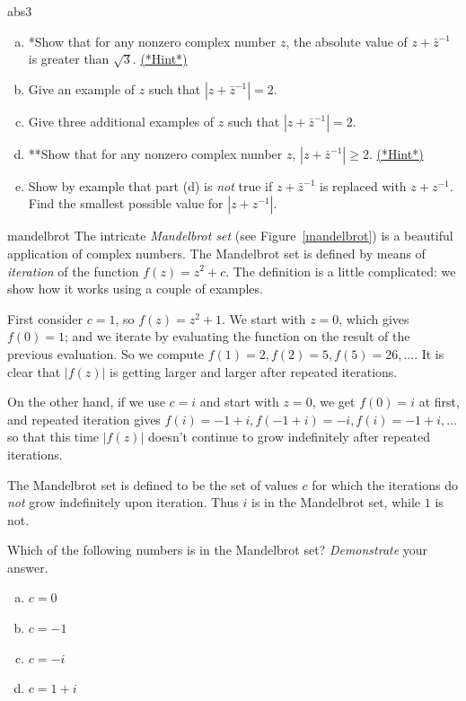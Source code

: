\begin{exercise}{abs3}
\begin{enumerate}[(a)]
\item *Show that for any nonzero complex number $z$, the absolute value of $z + \bar{z}^{-1}$ is greater than $\sqrt{3}$. 
\hyperref[sec:complex:hints]{(*Hint*)}

\item Give an example of $z$ such that $|z + \bar{z}^{-1}| = 2$. 
\item Give three additional examples of $z$ such that $|z + \bar{z}^{-1}| = 2$. 
\item **Show that for any nonzero complex number $z$, $|z + \bar{z}^{-1}| \ge 2$. 
\hyperref[sec:complex:hints]{(*Hint*)}
\item Show by example that part (d) is \emph{not} true if $z + \bar{z}^{-1}$ is replaced with $z + z^{-1}$.  Find the smallest possible 
value for $|z + z^{-1}|$.
\end{enumerate}
\end{exercise}


\begin{exercise}{mandelbrot}
The intricate \emph{Mandelbrot set} (see Figure~\ref{mandelbrot}) is a beautiful application of complex numbers.
The Mandelbrot set is defined by means of \emph{iteration} of the function $f(z) = z^2 + c$. The definition is a little complicated: we show how it works using a couple of examples.

First consider $c=1$, so $f(z) = z^2 + 1$. We start with $z=0$, which gives $f(0) = 1$; and we iterate by evaluating the function on the result of the previous evaluation. So we compute $f(1) = 2, f(2) = 5, f(5) = 26, ...$. It is clear that $|f(z)|$ is getting larger and larger after repeated iterations. 

On the other hand, if we use $c=i$ and start with $z=0$, we get $f(0) = i$ at first, and repeated iteration gives $f(i) = -1+i, f(-1+i) =- i, f(i) = -1 + i, \ldots$ so that this time $|f(z)|$ doesn't continue to grow indefinitely after repeated iterations. 

The Mandelbrot set is defined to be the set of values $c$ for which the iterations do \emph{not} grow indefinitely upon iteration. Thus $i$ is in the Mandelbrot set, while $1$ is not. 

Which of the following numbers is in the Mandelbrot set? \emph{Demonstrate} your answer.
\begin{multicols}{2}
\begin{enumerate}[(a)]
\item
$c = 0$
\item
$c = -1$
\item
$c = -i$
\item
$c = 1+i$
\end{enumerate}
\end{multicols}
\end{exercise}

